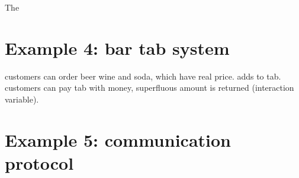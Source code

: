 The 

\section{Example 4: bar tab system}
customers can order beer wine and soda, which have real price. adds to tab. customers can pay tab with money, superfluous amount is returned (interaction variable).

\section{Example 5: communication protocol}

